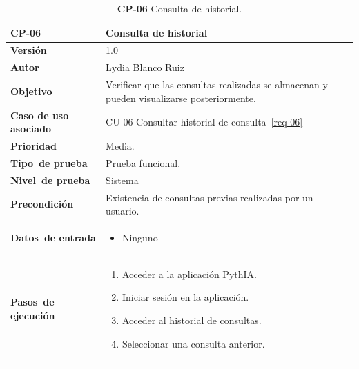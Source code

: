 \begin{table}[p]
	\centering
	\begin{tabularx}{\linewidth}{ p{} p{} }
		\toprule
		\textbf{CP-06}    & \textbf{Consulta de historial}\\
		\toprule
		\textbf{Versión}              & 1.0    \\
		\textbf{Autor}                & Lydia Blanco Ruiz \\
		\textbf{Objetivo}			 & Verificar que las consultas realizadas se almacenan y pueden visualizarse posteriormente.\\
		\textbf{Caso de uso asociado} &  CU-06 Consultar historial de consulta~\ref{req-06}\\
		\textbf{Prioridad}          & Media. \\
		\textbf{\mbox{Tipo de} \mbox{prueba}}         & Prueba funcional. \\
		\textbf{\mbox{Nivel de} \mbox{prueba}}        & Sistema\\
		\textbf{Precondición}        & Existencia de consultas previas realizadas por un usuario. \\
		\textbf{\mbox{Datos de} \mbox{entrada}} 		& 
		\begin{itemize}
		\tightlist
			\item Ninguno
		\end{itemize}				
		\\
		\textbf{\mbox{Pasos de} \mbox{ejecución}}		&
		\begin{enumerate}
		\tightlist
			\item Acceder a la aplicación \eng{web} PythIA.
			\item Iniciar sesión en la aplicación.
			\item Acceder al historial de consultas.
			\item Seleccionar una consulta anterior.
		\end{enumerate} \\
		\bottomrule
	\end{tabularx}
	\caption{\textbf{CP-06} Consulta de historial.}
	\label{prueb-06}
\end{table}


